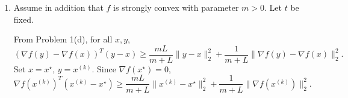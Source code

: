 \documentclass[11pt,letter,notitlepage]{article}
\theoremstyle{definition}
\begin{document}
\begin{solution}
\begin{enumerate}[label=(\alph*)]
    First, from
    \[
    x^{(k+1)}=x^{(k)}-\frac1L\nabla f(x^{(k)}),
    \]
    we have
    \[
    \begin{aligned}
    \|x^{(k+1)}-x^\star\|_2^2
    &=
    \left\|x^{(k)}-x^\star-\frac1L\nabla f(x^{(k)})\right\|_2^2\\
    &=
    \|x^{(k)}-x^\star\|_2^2
    -\frac{2}{L}\nabla f(x^{(k)})^T(x^{(k)}-x^\star)
    +\frac1{L^2}\|\nabla f(x^{(k)})\|_2^2.
    \end{aligned}
    \]
    Rearranging,
    \[
    \nabla f(x^{(k)})^T(x^{(k)}-x^\star)
    =
    \frac L2\Bigl(\|x^{(k)}-x^\star\|_2^2-\|x^{(k+1)}-x^\star\|_2^2\Bigr)
    +\frac1{2L}\|\nabla f(x^{(k)})\|_2^2.
    \]
    By convexity,
    \[
    f(x^{(k)})-p^\star
    =
    f(x^{(k)})-f(x^\star)
    \le
    \nabla f(x^{(k)})^T(x^{(k)}-x^\star).
    \]
    Hence
    \[
    f(x^{(k)})-p^\star
    \le
    \frac L2\Bigl(\|x^{(k)}-x^\star\|_2^2-\|x^{(k+1)}-x^\star\|_2^2\Bigr)
    +\frac1{2L}\|\nabla f(x^{(k)})\|_2^2.
    \]
    On the other hand, part (b) yields
    \[
    f(x^{(k+1)})\le f(x^{(k)})-\frac1{2L}\|\nabla f(x^{(k)})\|_2^2.
    \]
    Combining these two inequalities,
    \[
    f(x^{(k+1)})-p^\star
    \le
    \frac L2\Bigl(\|x^{(k)}-x^\star\|_2^2-\|x^{(k+1)}-x^\star\|_2^2\Bigr).
    \]
    Summing from $i=0$ to $k-1$,
    \[
    \sum_{i=0}^{k-1}\bigl(f(x^{(i+1)})-p^\star\bigr)
    \le
    \frac L2\|x^{(0)}-x^\star\|_2^2.
    \]
    Since GD is a descent method, the sequence $f(x^{(k)})$ is nonincreasing, so
    \[
    f(x^{(k)})-p^\star
    \le
    f(x^{(i)})-p^\star,\qquad i=1,\dots,k.
    \]
    Therefore
    \[
    k\bigl(f(x^{(k)})-p^\star\bigr)
    \le
    \sum_{i=0}^{k-1}\bigl(f(x^{(i+1)})-p^\star\bigr)
    \le
    \frac L2\|x^{(0)}-x^\star\|_2^2,
    \]
    i.e.
    \[
    f(x^{(k)})-p^\star
    \le
    \frac{L}{2k}\|x^{(0)}-x^\star\|_2^2.
    \]

    \item Assume in addition that $f$ is strongly convex with parameter $m>0$. Let $t$ be fixed.

    From Problem 1(d), for all $x,y$,
    \[
    (\nabla f(y)-\nabla f(x))^T (y-x)
    \ge
    \frac{mL}{m+L}\|y-x\|_2^2
    +
    \frac{1}{m+L}\|\nabla f(y)-\nabla f(x)\|_2^2.
    \]
    Set $x=x^\star$, $y=x^{(k)}$. Since $\nabla f(x^\star)=0$,
    \[
    \nabla f(x^{(k)})^T(x^{(k)}-x^\star)
    \ge
    \frac{mL}{m+L}\|x^{(k)}-x^\star\|_2^2
    +
    \frac{1}{m+L}\|\nabla f(x^{(k)})\|_2^2.
    \]


\end{enumerate}
\end{solution}
\end{document}
